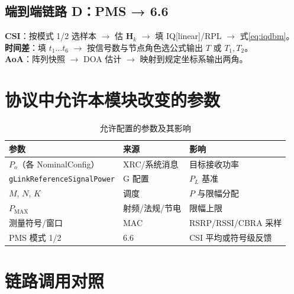 \documentclass[11pt,a4paper]{ctexart}
\begin{document}
\subsection{端到端链路 D：PMS → 6.6}

\textbf{CSI}：按模式 1/2 选样本 $\rightarrow$ 估 $\mathbf{H}_k$ $\rightarrow$ 填 IQ[linear]/RPL $\rightarrow$ 式\eqref{eq:iqdbm}。\\
\textbf{时间差}：填 $t_1\ldots t_6$ $\rightarrow$ 按信号数与节点角色选公式输出 $T$ 或 $T_1,T_2$。\\
\textbf{AoA}：阵列快照 $\rightarrow$ DOA 估计 $\rightarrow$ 映射到规定坐标系输出两角。

\section{协议中允许本模块改变的参数}

\begin{longtable}{L{4.5cm}L{4cm}L{5.5cm}}
\caption{允许配置的参数及其影响\label{tab:6545-tunable}} \\
\toprule
\textbf{参数} & \textbf{来源} & \textbf{影响} \\
\midrule
$P_o$（各 NominalConfig） & XRC/系统消息 & 目标接收功率 \\
\texttt{gLinkReferenceSignalPower} & G 配置 & $P_L$ 基准 \\
$M$, $N$, $K$ & 调度 & $P$ 与限幅分配 \\
$P_{\mathrm{MAX}}$ & 射频/法规/节电 & 限幅上限 \\
测量符号/窗口 & MAC & RSRP/RSSI/CBRA 采样 \\
PMS 模式 1/2 & 6.6 & CSI 平均或符号级反馈 \\
\bottomrule
\end{longtable}

\section{链路调用对照}
\end{document}
